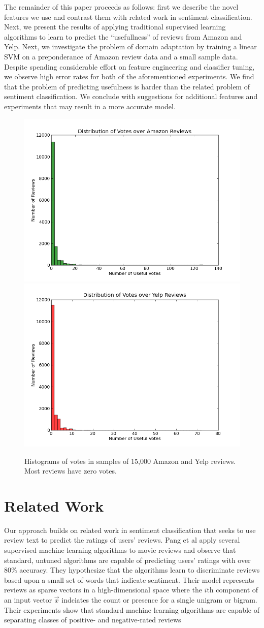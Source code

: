 \documentclass[letterpaper]{article}
\begin{document}
The remainder of this paper proceeds as follows: first we describe the novel 
features we use and contrast them with related work in sentiment 
classification.  Next, we present the results of applying traditional 
supervised learning algorithms to learn to predict the ``usefullness'' of 
reviews from Amazon and Yelp.  Next, we investigate the problem of domain 
adaptation by training a linear SVM on a preponderance of Amazon review data 
and a small sample data.  Despite spending considerable effort on feature 
engineering and classifier tuning, we observe high error rates for both of the 
aforementioned experiments.  We find that the problem of predicting usefulness 
is harder than the related problem of sentiment classification.  We conclude 
with suggestions for additional features and experiments that may result in 
a more accurate model.

\begin{figure}[h]
    \label{fig:vote-histos}
	\centering
	\includegraphics[width=0.30\linewidth]{amz_histo}
    \includegraphics[width=0.30\linewidth]{yelp_histo}
	\caption{Histograms of votes in samples of 15,000 Amazon and Yelp reviews.
    Most reviews have zero votes.}
\end{figure}

\section{Related Work}
Our approach builds on related work in sentiment classification that seeks to 
use review text to predict the ratings of users' reviews.  Pang et al 
\cite{PangSentimentClassification} apply several supervised machine learning 
algorithms to movie reviews and observe that standard, untuned algorithms are 
capable of predicting users' ratings with over $80\%$ accuracy.  They 
hypothesize that the algorithms learn to discriminate reviews based upon 
a small set of words that indicate sentiment.  Their model represents reviews 
as sparse vectors in a high-dimensional space where the $i$th component 
of an input vector $\vec{x}$ indciates the count or presence for a single 
unigram or bigram.  Their experiments show that standard machine learning 
algorithms are capable of separating classes of positive- and negative-rated
reviews 
\end{document}
